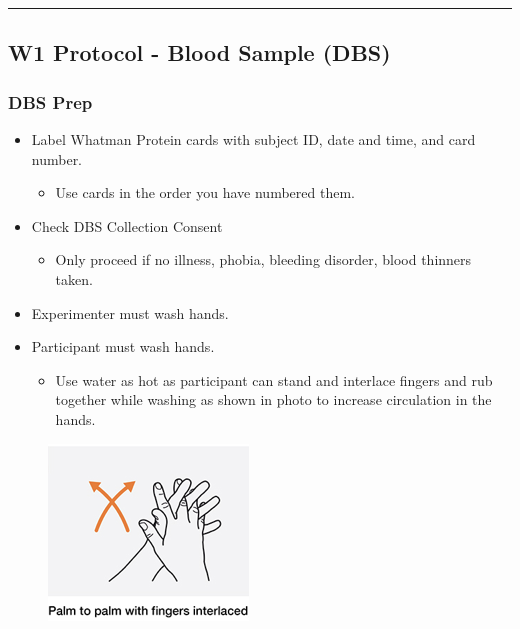 \documentclass[]{book}
\providecommand{\tightlist}{%
  \setlength{\itemsep}{0pt}\setlength{\parskip}{0pt}}
\begin{document}
\begin{center}\rule{0.5\linewidth}{0.5pt}\end{center}

\hypertarget{w1-protocol---blood-sample-dbs}{%
\subsection{W1 Protocol - Blood Sample (DBS)}\label{w1-protocol---blood-sample-dbs}}

\hypertarget{dbs-prep}{%
\subsubsection{DBS Prep}\label{dbs-prep}}

\begin{itemize}
\tightlist
\item
  Label Whatman Protein cards with subject ID, date and time, and card number.

  \begin{itemize}
  \tightlist
  \item
    Use cards in the order you have numbered them.
  \end{itemize}
\item
  Check DBS Collection Consent

  \begin{itemize}
  \tightlist
  \item
    Only proceed if no illness, phobia, bleeding disorder, blood thinners taken.
  \end{itemize}
\item
  Experimenter must wash hands.
\item
  Participant must wash hands.

  \begin{itemize}
  \tightlist
  \item
    Use water as hot as participant can stand and interlace fingers and rub together while washing as shown in photo to increase circulation in the hands.
  \end{itemize}
\end{itemize}

\begin{figure}
\centering
\includegraphics{images/dbs/1.png}
\caption{}
\end{figure}
\end{document}

